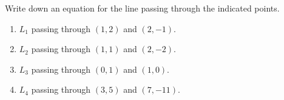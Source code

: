 Write down an equation for the line passing through the indicated points.

\begin{enumerate}[ref={\fcProblemRef}]
\item $L_1$ passing through $(1,2)$ and $(2,-1)$.
\item $L_2$ passing through $(1,1)$ and $(2,-2)$.
\item $L_3$ passing through $(0,1)$ and $(1,0)$.
\item $L_4$ passing through $(3,5)$ and $(7,-11)$.
\end{enumerate}
